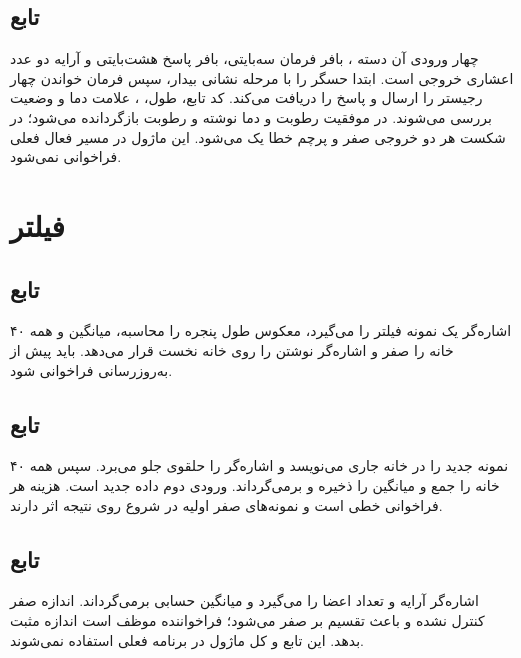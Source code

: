 \subsection{تابع }
چهار ورودی آن دسته
،
بافر فرمان سه‌بایتی، بافر پاسخ هشت‌بایتی و آرایه دو عدد اعشاری خروجی است. ابتدا حسگر را با مرحله نشانی بیدار، سپس فرمان خواندن چهار رجیستر را ارسال و پاسخ را دریافت می‌کند. کد تابع، طول،
،
علامت دما و وضعیت
بررسی می‌شوند. در موفقیت رطوبت و دما نوشته و رطوبت بازگردانده می‌شود؛ در شکست هر دو خروجی صفر و پرچم خطا یک می‌شود. این ماژول در مسیر فعال فعلی فراخوانی نمی‌شود.

\section{فیلتر }

\subsection{تابع }
اشاره‌گر یک نمونه فیلتر را می‌گیرد، معکوس طول پنجره را محاسبه، میانگین و همه ۴۰ خانه را صفر و اشاره‌گر نوشتن را روی خانه نخست قرار می‌دهد. باید پیش از به‌روزرسانی فراخوانی شود.

\subsection{تابع }
نمونه جدید را در خانه جاری می‌نویسد و اشاره‌گر را حلقوی جلو می‌برد. سپس همه ۴۰ خانه را جمع و میانگین را ذخیره و برمی‌گرداند. ورودی دوم داده جدید است. هزینه هر فراخوانی خطی است و نمونه‌های صفر اولیه در شروع روی نتیجه اثر دارند.

\subsection{تابع }
اشاره‌گر آرایه و تعداد اعضا را می‌گیرد و میانگین حسابی برمی‌گرداند. اندازه صفر کنترل نشده و باعث تقسیم بر صفر می‌شود؛ فراخواننده موظف است اندازه مثبت بدهد. این تابع و کل ماژول در برنامه فعلی استفاده نمی‌شوند.
